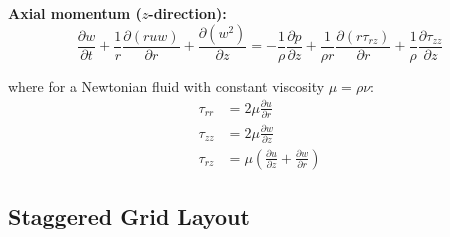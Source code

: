 \textbf{Axial momentum ($z$-direction):}
\begin{equation}
    \frac{\partial w}{\partial t}
    + \frac{1}{r}\frac{\partial(ruw)}{\partial r}
    + \frac{\partial(w^2)}{\partial z}
    = -\frac{1}{\rho}\frac{\partial p}{\partial z}
    + \frac{1}{\rho r}\frac{\partial(r\tau_{rz})}{\partial r}
    + \frac{1}{\rho}\frac{\partial\tau_{zz}}{\partial z}
    \label{eq:cyl_uw_momz}
\end{equation}

where for a Newtonian fluid with constant viscosity $\mu = \rho\nu$:
\begin{align}
    \tau_{rr} &= 2\mu\frac{\partial u}{\partial r}
    \\
    \tau_{zz} &= 2\mu\frac{\partial w}{\partial z}
    \\
    \tau_{rz} &= \mu\!\left(\frac{\partial u}{\partial z}+\frac{\partial w}{\partial r}\right)
\end{align}

\subsection{Staggered Grid Layout}

